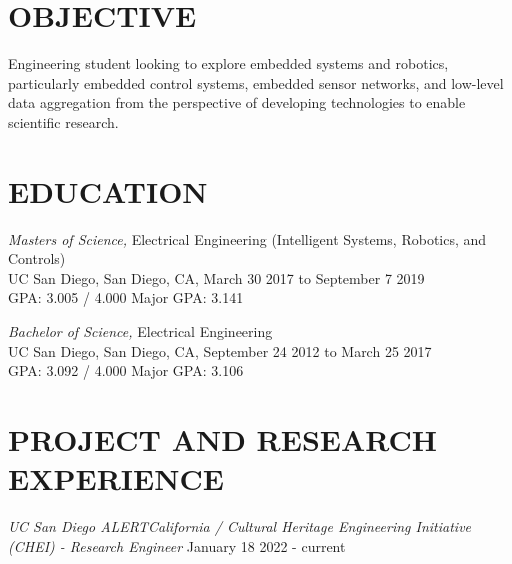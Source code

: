 \documentclass[line,margin]{res}
\begin{document}
\address{13336 Tobiasson Rd, Poway, CA 92064}
\address{nthui@ucsd.edu, (408) 838-5393}


\begin{resume}

\section{OBJECTIVE}
	Engineering student looking to explore embedded systems and robotics, particularly embedded control systems, embedded sensor networks, and low-level data aggregation from the perspective of developing technologies to enable scientific research.

\section{EDUCATION}
	{\sl Masters of Science,} Electrical Engineering (Intelligent Systems, Robotics, and Controls)\\
	UC San Diego, San Diego, CA, March 30 2017 to September 7 2019\\
	GPA: 3.005 / 4.000
	Major GPA: 3.141

	{\sl Bachelor of Science,} Electrical Engineering \\
	UC San Diego, San Diego, CA, September 24 2012 to March 25 2017\\
	GPA: 3.092 / 4.000
	Major GPA: 3.106

\section{PROJECT AND RESEARCH EXPERIENCE}
	{\sl UC San Diego ALERTCalifornia / Cultural Heritage Engineering Initiative (CHEI) - Research Engineer} \hfill January 18 2022 - current


\end{resume}
\end{document}
